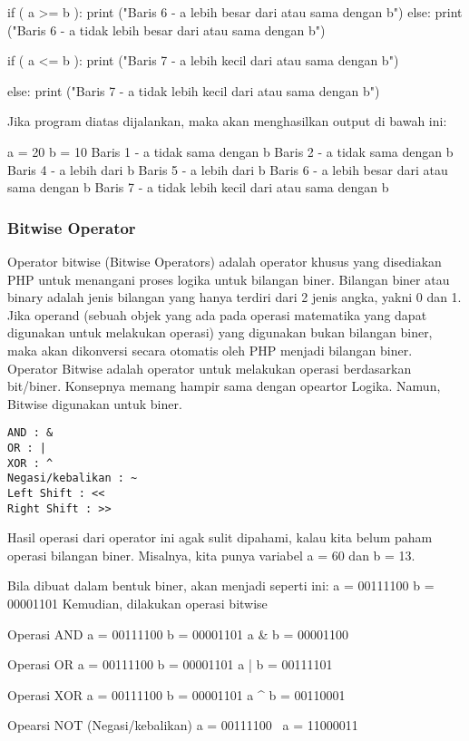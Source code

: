 \begin{eqation}
\begin{verbartim}
if ( a >= b ):
   print ("Baris 6 - a lebih besar dari atau sama dengan b") 
else:
   print ("Baris 6 - a tidak lebih besar dari atau sama dengan b") 

if ( a <= b ):
   print ("Baris 7 - a lebih kecil dari atau sama dengan b") 

else:
   print ("Baris 7 - a tidak lebih kecil dari atau sama dengan b")    
   
\end{verbartim}

Jika program diatas dijalankan, maka akan menghasilkan output di bawah ini:

a =  20
b =  10
Baris 1 - a tidak sama dengan b
Baris 2 - a tidak sama dengan b
Baris 4 - a lebih dari b
Baris 5 - a lebih dari b
Baris 6 - a lebih besar dari atau sama dengan b
Baris 7 - a tidak lebih kecil dari atau sama dengan b

\subsubsection{Bitwise Operator}
Operator bitwise (Bitwise Operators) adalah operator khusus yang disediakan PHP untuk menangani proses logika untuk bilangan biner. Bilangan biner atau binary adalah jenis bilangan yang hanya terdiri dari 2 jenis angka, yakni 0 dan 1. Jika operand (sebuah objek yang ada pada operasi matematika yang dapat digunakan untuk melakukan operasi) yang digunakan bukan bilangan biner, maka akan dikonversi secara otomatis oleh PHP menjadi bilangan biner. Operator Bitwise adalah operator untuk melakukan operasi berdasarkan bit/biner. Konsepnya memang hampir sama dengan opeartor Logika. Namun, Bitwise digunakan untuk biner.
\begin{verbatim}
AND : &
OR : |
XOR : ^
Negasi/kebalikan : ~
Left Shift : <<
Right Shift : >>
\end{verbatim}

Hasil operasi dari operator ini agak sulit dipahami, kalau kita belum paham operasi bilangan biner.
Misalnya, kita punya variabel a = 60 dan b = 13.

Bila dibuat dalam bentuk biner, akan menjadi seperti ini:
a = 00111100
b = 00001101
Kemudian, dilakukan operasi bitwise

Operasi AND
a = 00111100
b = 00001101
a & b = 00001100

Operasi OR
a = 00111100
b = 00001101
a | b = 00111101

Operasi XOR
a = 00111100
b = 00001101
a ^ b = 00110001

Opearsi NOT (Negasi/kebalikan)
a = 00111100
~a  = 11000011



\end{eqation}
